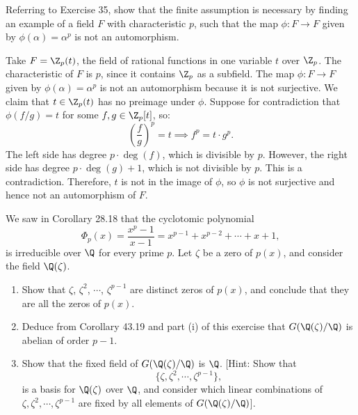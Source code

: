 \begin{problem}[43.37]
  Referring to Exercise 35, show that the finite assumption is necessary by finding an example of a field $F$ with characteristic $p$, such that the map $\phi : F \to F$ given by $\phi(\alpha) = \alpha^p$ is not an automorphism.
\end{problem}

\begin{solution}
  Take $F = \Z_p(t)$, the field of rational functions in one variable $t$ over $\Z_p$. The characteristic of $F$ is $p$, since it contains $\Z_p$ as a subfield. The map $\phi : F \to F$ given by $\phi(\alpha) = \alpha^p$ is not an automorphism because it is not surjective. We claim that $t \in \Z_p(t)$ has no preimage under $\phi$. Suppose for contradiction that $\phi(f/g) = t$ for some $f, g \in \Z_p[t]$, so:
  \[%
    \left(\frac{f}{g}\right)^p = t \implies f^p = t \cdot g^p
  .\]%
  The left side has degree $p \cdot \deg(f)$, which is divisible by $p$. However, the right side has degree $p \cdot \deg(g) + 1$, which is not divisible by $p$. This is a contradiction. Therefore, $t$ is not in the image of $\phi$, so $\phi$ is not surjective and hence not an automorphism of $F$.
\end{solution}

\begin{problem}[43.38]
  We saw in Corollary 28.18 that the cyclotomic polynomial
  \[%
    \Phi_p(x) = \frac{x^p - 1}{x - 1} = x^{p-1} + x^{p-2} + \cdots + x + 1
  ,\]%
  is irreducible over $\Q$ for every prime $p$. Let $\zeta$ be a zero of $p(x)$, and consider the field $\Q(\zeta)$.
  \begin{enumerate}
    \item Show that $\zeta$, $\zeta^2$, $\cdots$, $\zeta^{p-1}$ are distinct zeros of $p(x)$, and conclude that they are all the zeros of $p(x)$.

    \item Deduce from Corollary 43.19 and part (i) of this exercise that $G(\Q(\zeta)/\Q)$ is abelian of order $p - 1$.

    \item Show that the fixed field of $G(\Q(\zeta)/\Q)$ is $\Q$. [Hint: Show that
      \[%
        \{\zeta, \zeta^2, \cdots, \zeta^{p-1}\}
      ,\]%
      is a basis for $\Q(\zeta)$ over $\Q$, and consider which linear combinations of $\zeta, \zeta^2, \cdots, \zeta^{p-1}$ are fixed by all elements of $G(\Q(\zeta)/\Q)$].
  \end{enumerate}
\end{problem}

